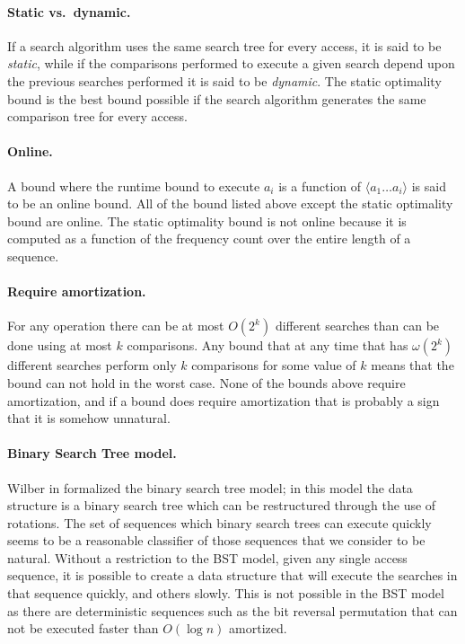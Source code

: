 \documentclass{llncs}
\begin{document}
\paragraph{Static vs.~dynamic.} If a search algorithm uses the same search tree for every access, it is said to be \emph{static}, while if the comparisons performed to execute a given search depend upon the previous searches performed it is said to be \emph{dynamic}. The static optimality bound is the best bound possible if the search algorithm generates the same comparison tree for every access.

\paragraph{Online.} A bound where the runtime bound to execute $a_i$ is a function of $\langle a_1 \ldots a_i \rangle$ is said to be an online bound. All of the bound listed above except the static optimality bound are online. The static optimality bound is not online because it is computed as a function of the frequency count over the entire length of a sequence.

\paragraph{Require amortization.} For any operation there can be at most $O(2^k)$ different searches than can be done using at most $k$ comparisons.  Any bound that at any time that has $\omega(2^k)$ different searches perform only $k$ comparisons for some value of $k$ means that the bound can not hold in the worst case.  None of the bounds above require amortization, and if a bound does require amortization that is probably a sign that it is somehow unnatural.

\paragraph{Binary Search Tree model.} Wilber in \cite{DBLP:journals/siamcomp/Wilber89} formalized the binary search tree model; in this model the data structure is a binary search tree which can be restructured through the use of rotations.
The set of sequences which binary search trees can execute quickly seems to be a reasonable classifier of those sequences that we consider to be natural. Without a restriction to the BST model, given any single access sequence, it is possible to create a data structure that will execute the searches in that sequence quickly, and others slowly. This is not possible in the BST model as there are deterministic sequences such as the bit reversal permutation that can not be executed faster than $O(\log n)$ amortized.
\end{document}
